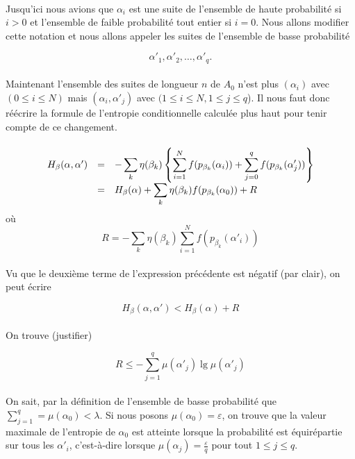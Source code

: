 	\paragraph{}
	Jusqu'ici nous avions que $\alpha_i$ est une suite de l'ensemble de haute 
	probabilité si $i>0$ et l'ensemble de faible probabilité tout entier si 
	$i=0$. Nous allons modifier cette notation et nous allons appeler les 
	suites de l'ensemble de basse probabilité 
	
	\[\alpha'_1, \alpha'_2, \dots, \alpha'_q.\]
	
	\paragraph{}
	Maintenant l'ensemble des suites de longueur $n$ de $A_0$ n'est plus 
	$(\alpha_i)$ avec $(0 \le i \le N)$ mais $(\alpha_i, \alpha'_j)$ avec 
	$(1\le i \le N, 1 \le j \le q$). Il nous faut donc réécrire la formule de
	 l'entropie conditionnelle calculée plus haut pour tenir compte de ce
	 changement.
	
	\paragraph{}
	\[
		\begin{array}{r c >{\displaystyle}l}
			H_\beta(\alpha,\alpha') &=& 
				- \sum_k\eta(\beta_k)\left\{
					\sum_{i=1}^Nf(p_{\beta_k}(\alpha_i))+
					\sum_{j=0}^qf(p_{\beta_k}(\alpha'_j))
				\right\}\\
			&=& H_\beta(\alpha) + 
				\sum_k\eta(\beta_k)f(p_{\beta_k}(\alpha_0))+R
		\end{array}
	\]
	où
	\[R=- \sum_k\eta(\beta_k)\sum_{i=1}^Nf(p_{\beta_k}(\alpha'_i))\]
	
	\paragraph{}
	Vu que le deuxième terme de l'expression précédente est négatif 
	(par clair), on peut écrire
	
	\[H_\beta(\alpha,\alpha') < H_\beta(\alpha) + R\]
	
	\paragraph{}
	On trouve (justifier)
	
	\[R \le -\sum_{j=1}^q\mu(\alpha'_j)\lg\mu(\alpha'_j)\]
	
	\paragraph{}
	On sait, par la définition de l'ensemble de basse probabilité que 
	$\sum_{j=1}^q =\mu(\alpha_0) < \lambda$. Si nous posons 
	$\mu(\alpha_0)=\varepsilon$, on trouve que la valeur maximale 
	de l'entropie de $\alpha_0$ est atteinte lorsque la probabilité 
	est équirépartie sur tous les $\alpha'_i$, c'est-à-dire lorsque
	 $\mu(\alpha_j)=\frac{\varepsilon}{q}$ pour tout $1\le j\le q$.
	
